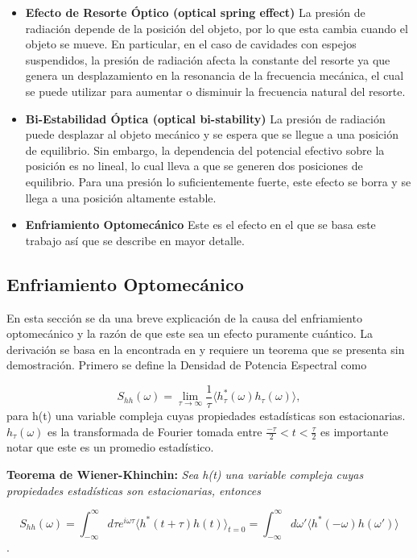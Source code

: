 \documentclass[10pt,a4paper]{report}
\begin{document}
\begin{itemize}
\item \textbf{Efecto de Resorte Óptico (optical spring effect)} La
  presión de radiación depende de la posición del objeto, por lo que esta
  cambia cuando el objeto se mueve. En particular, en el caso de
  cavidades con espejos suspendidos, la presión de radiación afecta la
  constante del resorte ya que genera un desplazamiento en la
  resonancia de la frecuencia mecánica, el cual se puede utilizar para
  aumentar o disminuir la frecuencia natural del
  resorte.\cite{BraginskyPE}

\item \textbf{Bi-Estabilidad Óptica (optical bi-stability)} La presión
  de radiación puede desplazar al objeto mecánico y se espera que se
  llegue a una posición de equilibrio. Sin embargo, la dependencia del
  potencial efectivo sobre la posición es no lineal, lo cual lleva a
  que se generen dos posiciones de equilibrio. Para una presión lo
  suficientemente fuerte, este efecto se borra y se llega a una
  posición altamente estable\cite{DorselOB}.

\item \textbf{Enfriamiento Optomecánico} Este es el efecto en el que se basa este trabajo así que se describe en mayor detalle. 
\end{itemize}

\subsection{Enfriamiento Optomecánico}

En esta sección se da una breve explicación de la causa del enfriamiento optomecánico y la razón de que este sea un efecto puramente cuántico. La derivación se basa en la encontrada en \cite{WarwickQO} y requiere un teorema que se presenta sin demostración. Primero se define la  Densidad de Potencia Espectral como

\begin{equation}
S_{hh}(\omega) = \lim_{\tau \to\infty} \frac{1}{\tau}\langle h_\tau^*(\omega)h_\tau(\omega) \rangle ,
\end{equation}
para h(t) una variable compleja cuyas propiedades estadísticas son
estacionarias. $h_\tau(\omega)$ es la
transformada de Fourier tomada entre $\frac{-\tau}{2}< t <
\frac{\tau}{2}$ es importante notar que este es un promedio estadístico.

\begin{center}
\textbf{Teorema de Wiener-Khinchin:} \textit{Sea h(t) una variable
  compleja cuyas propiedades estadísticas son estacionarias, entonces
}

\begin{equation} \label{WienerKhichin}
S_{hh}(\omega) = \int_{-\infty}^\infty d\tau e^{i\omega \tau} \langle h^*(t+\tau)h(t) \rangle_{t=0} = \int_{-\infty}^\infty d\omega' \langle h^*(-\omega) h(\omega') \rangle
\end{equation}
.
\end{center}
\end{document}
